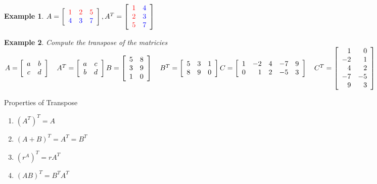 \documentclass[a4paper,12pt,openany]{book}
\theoremstyle{defn}
\theoremstyle{expl}
\newtheorem{expl}{Example}[section]
\begin{document}
\begin{expl}
$A=\left[\begin{array}{ccc} \color{red}1&\color{red}2&\color{red}5\\\color{blue}4&\color{blue}3&\color{blue}7\end{array}\right], A^T=\left[\begin{array}{cc}\color{red}1&\color{blue}4\\\color{red}2&\color{blue}3\\\color{red}5&\color{blue}7\end{array}\right]$
\end{expl}
\begin{expl}\textup{Compute the transpose of the matricies\\}
$A=\left[\begin{array}{cc}a&b\\c&d\end{array}\right]\quad A^T = \left[\begin{array}{cc}a&c\\b&d\end{array}\right]\\
B=\left[\begin{array}{cc}5&8\\3&9\\1&0\end{array}\right]  \quad B^T=\left[\begin{array}{ccc}5&3&1\\8&9&0\end{array}\right] \\
C=\left[\begin{array}{crccc}1&-2&4&-7&9\\0&1&2&-5&3\end{array}\right]  \quad C^T=\left[\begin{array}{rr}1&0\\-2&1\\4&2\\-7&-5\\9&3\end{array}\right]$
\end{expl}
\noindent Properties of Transpose
\begin{multicols}{2}
\begin{enumerate}
\item $(A^T)^T=A$
\item $(A+B)^T=A^T=B^T$
\item $(r^A)^T=rA^T$
\item $(AB)^T=B^TA^T$
\end{enumerate}
\end{multicols}
\end{document}
